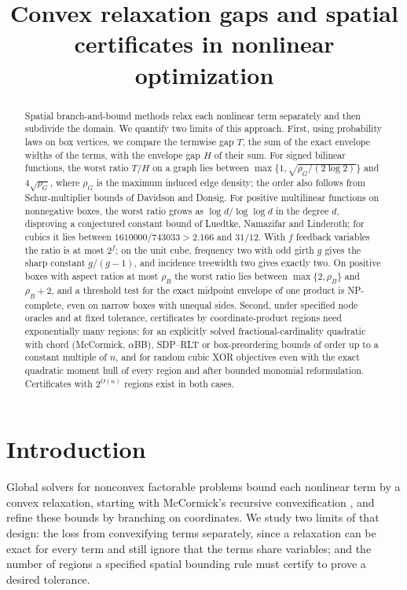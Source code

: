 \documentclass[11pt]{article}
\title{Convex relaxation gaps and spatial certificates in nonlinear optimization}
\author{}
\date{}
\begin{document}
\maketitle
\begin{abstract}
Spatial branch-and-bound methods relax each nonlinear term separately and
then subdivide the domain. We quantify two limits of this approach. First,
using probability laws on box vertices, we compare the termwise gap $T$,
the sum of the exact envelope widths of the terms, with the envelope gap
$H$ of their sum. For signed bilinear functions, the worst ratio $T/H$ on a
graph lies between $\max\{1,\sqrt{\rho_G/(2\log2)}\}$ and
$4\sqrt{\rho_G}$, where $\rho_G$ is the maximum induced edge density; the
order also follows from Schur-multiplier bounds of Davidson and Donsig.
For positive multilinear functions on nonnegative boxes, the worst ratio
grows as $\log d/\log\log d$ in the degree $d$, disproving a conjectured
constant bound of Luedtke, Namazifar and Linderoth; for cubics it lies
between $1610000/743033>2.166$ and $31/12$. With $f$ feedback variables
the ratio is at most $2^f$; on the unit cube, frequency two with odd
girth $g$ gives the sharp constant $g/(g-1)$, and incidence treewidth two
gives exactly two. On positive boxes with aspect ratios at most $\rho_B$
the worst ratio lies between $\max\{2,\rho_B\}$ and $\rho_B+2$, and a
threshold test for the exact midpoint envelope of one product is
NP-complete, even on narrow boxes with unequal sides. Second, under
specified node oracles and at fixed tolerance, certificates by
coordinate-product regions need exponentially many regions: for an
explicitly solved fractional-cardinality quadratic with chord (McCormick,
$\alpha$BB), SDP--RLT or box-preordering bounds of order up to a constant
multiple of $n$, and for random cubic XOR objectives even with the exact
quadratic moment hull of every region and after bounded monomial
reformulation. Certificates with $2^{O(n)}$ regions exist in both cases.
\end{abstract}
\setcounter{tocdepth}{1}
\tableofcontents
\clearpage
\section{Introduction}\label{sec:introduction}
Global solvers for nonconvex factorable problems bound each nonlinear term
by a convex relaxation, starting with McCormick's recursive
convexification \citep{McCormick1976}, and refine these bounds by
branching on coordinates. We study two limits of that design: the loss from
convexifying terms separately, since a relaxation can be exact for every
term and still ignore that the terms share variables; and the number of
regions a specified spatial bounding rule must certify to prove a desired
tolerance.
\end{document}
